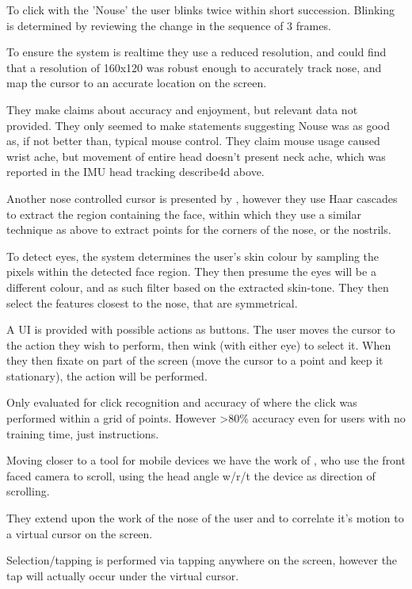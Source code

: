 To click with the 'Nouse' the user blinks twice within short succession. Blinking is determined by reviewing the change in the sequence of 3 frames.

To ensure the system is realtime they use a reduced resolution, and could find that a resolution of 160x120 was robust enough to accurately track nose, and map the cursor to an accurate location on the screen.

They make claims about accuracy and enjoyment, but relevant data not provided. They only seemed to make statements suggesting Nouse was as good as, if not better than, typical mouse control.
They claim mouse usage caused wrist ache, but movement of entire head doesn't present neck ache, which was reported in the IMU head tracking describe4d above\cite{yan2018headgesture}.

Another nose controlled cursor is presented by \citeauthor{varona2008hands}, however they use Haar cascades to extract the region containing the face, within which they use a similar technique as above\cite{gorodnichy2002importance} to extract points for the corners of the nose, or the nostrils\cite{varona2008hands}.

To detect eyes, the system determines the user's skin colour by sampling the pixels within the detected face region. They then presume the eyes will be a different colour, and as such filter based on the extracted skin-tone. They then select the features closest to the nose, that are symmetrical.

A UI is provided with possible actions as buttons. The user moves the cursor to the action they wish to perform, then wink (with either eye) to select it. When they then fixate on part of the screen (move the cursor to a point and keep it stationary), the action will be performed.

Only evaluated for click recognition and accuracy of where the click was performed within a grid of points. However >80\% accuracy even for users with no training time, just instructions.

Moving closer to a tool for mobile devices we have the work of \citeauthor{roig2015face}, who use the front faced camera to scroll, using the head angle w/r/t the device as direction of scrolling.\cite{roig2015face}

They extend upon the work of \citeauthor{varona2008hands}\cite{varona2008hands} the nose of the user and to correlate it's motion to a virtual cursor on the screen.

Selection/tapping is performed via tapping anywhere on the screen, however the tap will actually occur under the virtual cursor.

